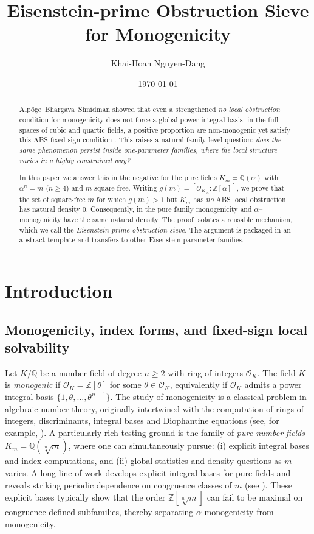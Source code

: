 \documentclass[11pt,letterpaper]{amsart}
\title{Eisenstein-prime Obstruction Sieve for Monogenicity}
\author[K.-H. Nguyen-Dang]{Khai-Hoan Nguyen-Dang}
\date{\today}
\newcommand{\Z}{\mathbb{Z}}
\newcommand{\Q}{\mathbb{Q}}
\newcommand{\Ocal}{\mathcal{O}}
\theoremstyle{plain}
\theoremstyle{definition}
\theoremstyle{remark}
\theoremstyle{plain}
\begin{document}
\maketitle
\begin{abstract}
Alp\"oge--Bhargava--Shnidman showed that even a strengthened \emph{no local obstruction} condition for monogenicity does not force a global power integral basis: in the full spaces of cubic and quartic fields, a positive proportion are non-monogenic yet satisfy this ABS fixed-sign condition \cite{ABSCubic,ABSQuartic}. This raises a natural family-level question: \emph{does the same phenomenon persist inside one-parameter families, where the local structure varies in a highly constrained way?}

In this paper we answer this in the negative for the pure fields $K_m=\Q(\alpha)$ with $\alpha^n=m$ ($n\ge 4$) and $m$ square-free. Writing $g(m)=[\Ocal_{K_m}:\Z[\alpha]]$, we prove that the set of square-free $m$ for which $g(m)>1$ but $K_m$ has \emph{no} ABS local obstruction has natural density $0$. Consequently, in the pure family monogenicity and $\alpha$--monogenicity have the same natural density. The proof isolates a reusable mechanism, which we call the \emph{Eisenstein-prime obstruction sieve}. The argument is packaged in an abstract template and transfers to other Eisenstein parameter families.
\end{abstract}

\tableofcontents
\section{Introduction}
\label{sec:introduction}

\subsection{Monogenicity, index forms, and fixed-sign local solvability}

Let $K/\Q$ be a number field of degree $n\ge2$ with ring of integers $\Ocal_K$. The field $K$ is \emph{monogenic} if $\Ocal_K=\Z[\theta]$ for some $\theta\in\Ocal_K$, equivalently if $\Ocal_K$ admits a power integral basis $\{1,\theta,\dots,\theta^{n-1}\}$. The study of monogenicity is a classical problem in algebraic number theory, originally intertwined with the computation of rings of integers,
discriminants, integral bases and Diophantine equations (see, for example, \cite{EG17, Gaal2019Book,GaalSurvey}). A particularly rich testing ground is the family of \emph{pure number fields} $K_m=\Q(\sqrt[n]{m})$, where one can simultaneously pursue:
(i) explicit integral bases and index computations, and
(ii) global statistics and density questions as $m$ varies.
A long line of work develops explicit integral bases for pure fields and reveals striking periodic dependence on congruence classes of $m$ (see \cite{GaalRemete2017,JKS2021,ND25}).  These explicit bases typically show that the order $\Z[\sqrt[n]{m}]$ can fail to be maximal on congruence-defined subfamilies, thereby separating $\alpha$-monogenicity from monogenicity.
\end{document}

